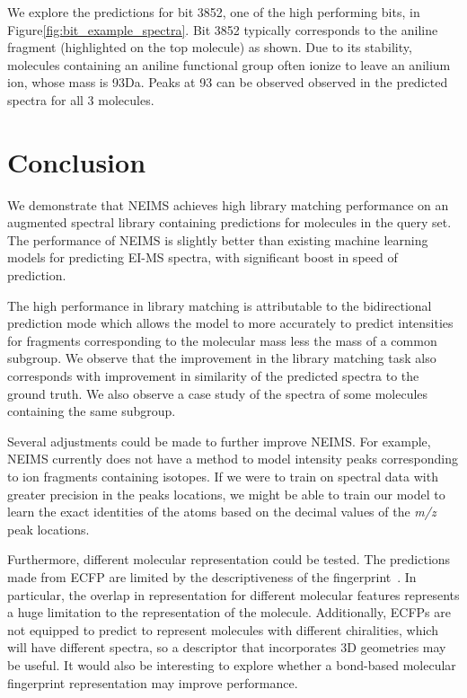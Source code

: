 We explore the predictions for bit 3852, one of the high performing bits, in Figure\ref{fig:bit_example_spectra}. Bit 3852 typically corresponds to the aniline fragment (highlighted on the top molecule) as shown. Due to its stability, molecules containing an aniline functional group often ionize to leave an anilium ion, whose mass is 93Da. Peaks at 93 can be observed observed in the predicted spectra for all 3 molecules.

\section{Conclusion}

We demonstrate that NEIMS achieves high library matching performance on an augmented spectral library containing predictions for molecules in the query set. 
The performance of NEIMS is slightly better than existing machine learning models for predicting EI-MS spectra, with significant boost in speed of prediction.

The high performance in library matching is attributable to the bidirectional prediction mode which allows the model to more accurately to predict intensities for fragments corresponding to the molecular mass less the mass of a common subgroup. We observe that the improvement in the library matching task also corresponds with improvement in similarity of the predicted spectra to the ground truth. We also observe a case study of the spectra of some molecules containing the same subgroup.

Several adjustments could be made to further improve NEIMS. For example, NEIMS currently does not have a method to model intensity peaks corresponding to ion fragments containing isotopes. If we were to train on spectral data with greater precision in the peaks locations, we might be able to train our model to learn the exact identities of the atoms based on the decimal values of the \textit{m/z} peak locations.

Furthermore, different molecular representation could be tested. The predictions made from ECFP are limited by the descriptiveness of the fingerprint~\cite{rdkit_blogpost_collide_bits}. In particular, the overlap in representation for different molecular features represents a huge limitation to the representation of the molecule. Additionally, ECFPs are not equipped to predict to represent molecules with different chiralities, which will have different spectra, so a descriptor that incorporates 3D geometries may be useful. It would also be interesting to explore whether a bond-based molecular fingerprint representation\cite{kearnes2016molecular} may improve performance.

